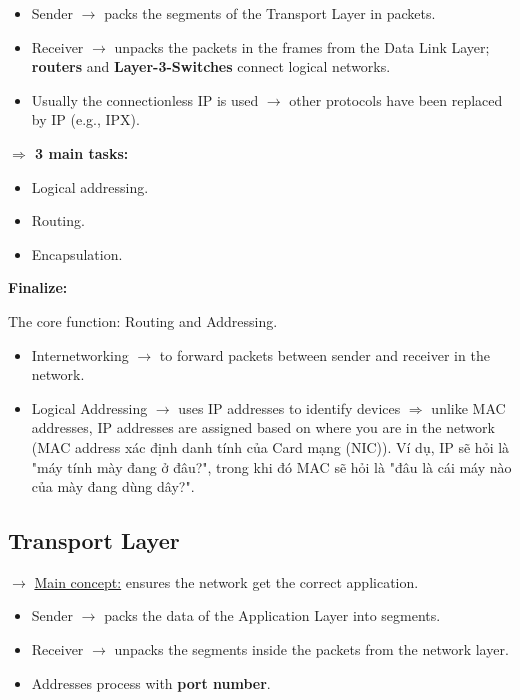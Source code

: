 \begin{itemize}
    \item Sender $\rightarrow$ packs the segments of the Transport Layer in packets.
    \item Receiver $\rightarrow$ unpacks the packets in the frames from the Data Link Layer; \textbf{routers} and \textbf{Layer-3-Switches} connect logical networks.
    \item Usually the connectionless IP is used $\rightarrow$ other protocols have been replaced by IP (e.g., IPX).
\end{itemize}

\noindent
\textbf{$\Rightarrow$ 3 main tasks:}

\begin{itemize}
    \item Logical addressing.
    \item Routing.
    \item Encapsulation.
\end{itemize}

\noindent
\textbf{Finalize:}
\medskip

\noindent
The core function: Routing and Addressing.

\begin{itemize}
    \item Internetworking $\rightarrow$ to forward packets between sender and receiver in the network.
    \item Logical Addressing $\rightarrow$ uses IP addresses to identify devices $\Rightarrow$ unlike MAC addresses, IP addresses are assigned based on where you are in the network (MAC address xác định danh tính của Card mạng (NIC)). Ví dụ, IP sẽ hỏi là "máy tính mày đang ở đâu?", trong khi đó MAC sẽ hỏi là "đâu là cái máy nào của mày đang dùng dây?".
\end{itemize}
\medskip

\subsection{Transport Layer}

\noindent
$\rightarrow$ \underline{Main concept:} ensures the network get the correct application.
\medskip

\begin{itemize}
    \item Sender $\rightarrow$ packs the data of the Application Layer into segments.
    \item Receiver $\rightarrow$ unpacks the segments inside the packets from the network layer.
    \item Addresses process with \textbf{port number}.
\end{itemize}
\medskip

